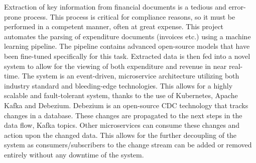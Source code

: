 
\noindent
Extraction of key information from financial documents is a tedious and error-prone process.
This process is critical for compliance reasons, so it must be performed in a competent manner, often at great expense.
\bigbreak
This project automates the parsing of expenditure documents (invoices etc.) using a machine learning pipeline. 
The pipeline contains advanced open-source models that have been fine-tuned specifically for this task. 
Extracted data is then fed into a novel system to allow for the viewing of both expenditure and revenue in near real-time.
\bigbreak
The system is an event-driven, microservice architecture utilizing both industry standard and bleeding-edge technologies. 
This allows for a highly scalable and fault-tolerant system, thanks to the use of Kubernetes, Apache Kafka and Debezium.
Debezium is an open-source CDC technology that tracks changes in a database. 
These changes are propagated to the next steps in the data flow, Kafka topics.
Other microservices can consume these changes and action upon the changed data. 
This allows for the further decoupling of the system as consumers/subscribers to the change stream can be
added or removed entirely without any downtime of the system.
